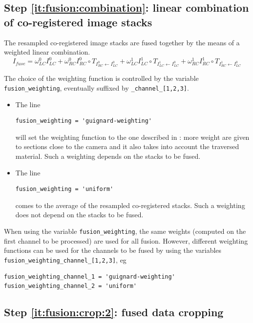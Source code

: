 \subsection{Step \ref{it:fusion:combination}: linear combination of co-registered image stacks}
\label{sec:cli:fuse:stack:fusion}

The resampled co-registered image stacks are fused together by the means of a weighted linear combination.
\begin{displaymath}
I_{fuse} =
\omega^{0}_{LC} I^{0}_{LC}
+ \omega^{0}_{RC} I^{0}_{RC} \circ T_{I^{0}_{RC} \leftarrow I^{0}_{LC}}
+ \omega^{1}_{LC} I^{1}_{LC} \circ T_{I^{1}_{LC} \leftarrow I^{0}_{LC}}
+ \omega^{1}_{RC} I^{1}_{RC} \circ T_{I^{1}_{RC} \leftarrow I^{0}_{LC}}
\end{displaymath}

The choice of the weighting function is controlled by the variable \texttt{fusion\_weighting}, eventually suffixed by \texttt{\_channel\_[1,2,3]}.

\begin{itemize}
\item The line
\begin{verbatim}
fusion_weighting = 'guignard-weighting'
\end{verbatim}
will set the weighting function to the one described in \cite{guignard:tel-01278725}: more weight are given to sections close to the camera and it also takes into account the traversed material. Such a weighting depends on the stacks to be fused.
\item The line
\begin{verbatim}
fusion_weighting = 'uniform'
\end{verbatim}
comes to the average of the resampled co-registered stacks. Such a weighting does not depend on the stacks to be fused.
\end{itemize}


When using the variable \texttt{fusion\_weighting}, the same weights (computed on the first channel to be processed) are used for all fusion. However, different weighting functions can be used for the channels to be fused by using the variables  \texttt{fusion\_weighting\_channel\_[1,2,3]}, eg
\begin{verbatim}
fusion_weighting_channel_1 = 'guignard-weighting'
fusion_weighting_channel_2 = 'uniform'
\end{verbatim}


\subsection{Step \ref{it:fusion:crop:2}: fused data cropping}
\label{sec:cli:fuse:fused:data:cropping}

